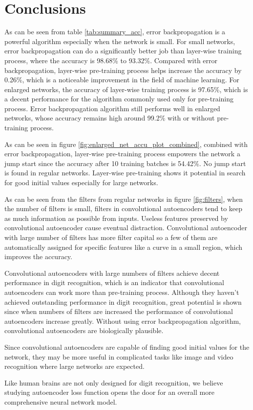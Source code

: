\chapter{Conclusions} %

\label{Chapter 5} %



As can be seen from table \ref{tab:summary_acc}, error backpropagation is a powerful algorithm especially when the network is small. For small networks, error backpropagation can do a significantly better job than layer-wise training process, where the accuracy is 98.68\% to 93.32\%. Compared with error backpropagation, layer-wise pre-training process helps increase the accuracy by 0.26\%, which is a noticeable improvement in the field of machine learning. For enlarged networks, the accuracy of layer-wise training process is 97.65\%, which is a decent performance for the algorithm commonly used only for pre-training process. Error backpropagation algorithm still performs well in enlarged networks, whose accuracy remains high around 99.2\% with or without pre-training process. 

As can be seen in figure \ref{fig:enlarged_net_accu_plot_combined}, combined with error backpropagation, layer-wise pre-training process empowers the network a jump start since the accuracy after 10 training batches is 54.42\%. No jump start is found in regular networks. Layer-wise pre-training shows it potential in search for good initial values especially for large networks. 

As can be seen from the filters from regular networks in figure \ref{fig:filters}, when the number of filters is small, filters in convolutional autoencoders tend to keep as much information as possible from inputs. Useless features preserved by convolutional autoencoder cause eventual distraction. Convolutional autoencoder with large number of filters has more filter capital so a few of them are automatically assigned for specific features like a curve in a small region, which improves the accuracy. 



Convolutional autoencoders with large numbers of filters achieve decent performance in digit recognition, which is an indicator that convolutional autoencoders can work more than pre-training process. Although they haven't achieved outstanding performance in digit recognition, great potential is shown since when numbers of filters are increased the performance of convolutional autoencoders increase greatly. Without using error backpropagation algorithm, convolutional autoencoders are biologically plausible. 

Since convolutional autoencoders are capable of finding good initial values for the network, they may be more useful in complicated tasks like image and video recognition where large networks are expected. 

Like human brains are not only designed for digit recognition, we believe studying autoencoder loss function opens the door for an overall more comprehensive neural network model. 